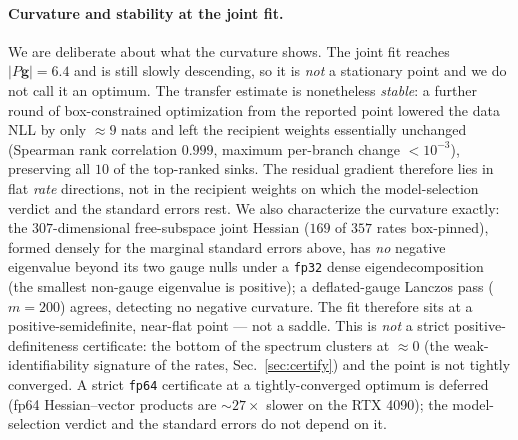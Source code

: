 \documentclass[11pt]{article}
\newcommand{\grad}{\mathbf{g}}
\begin{document}
\paragraph{Curvature and stability at the joint fit.} We are deliberate
about what the curvature shows. The joint fit reaches $|P\grad|{=}6.4$ and is still
slowly descending, so it is \emph{not} a stationary point and we do not call it an
optimum. The transfer estimate is nonetheless \emph{stable}: a further round of
box-constrained optimization from the reported point lowered the data NLL by only
${\approx}9$ nats and left the recipient weights essentially unchanged (Spearman rank
correlation $0.999$, maximum per-branch change $<\!10^{-3}$), preserving all $10$ of the
top-ranked sinks. The residual gradient therefore lies in flat \emph{rate} directions,
not in the recipient weights on which the model-selection verdict and the standard
errors rest. We also characterize the curvature exactly: the $307$-dimensional
free-subspace joint Hessian ($169$ of $357$ rates box-pinned), formed densely for the
marginal standard errors above, has \emph{no} negative eigenvalue beyond its two gauge
nulls under a \texttt{fp32} dense eigendecomposition (the smallest non-gauge eigenvalue
is positive); a deflated-gauge Lanczos pass ($m{=}200$) agrees, detecting no negative
curvature. The fit therefore sits at a positive-semidefinite, near-flat point --- not a
saddle. This is \emph{not} a strict positive-definiteness certificate: the bottom of the
spectrum clusters at $\approx\!0$ (the weak-identifiability signature of the rates,
Sec.~\ref{sec:certify}) and the point is not tightly converged. A strict \texttt{fp64}
certificate at a tightly-converged optimum is deferred (fp64 Hessian--vector products are
$\sim\!27\times$ slower on the \textsc{RTX 4090}); the model-selection verdict and the
standard errors do not depend on it.
\end{document}

